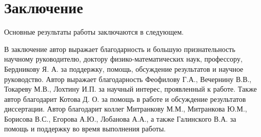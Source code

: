 \chapter*{Заключение}                       %


Основные результаты работы заключаются в следующем.



В заключение автор выражает благодарность и большую признательность научному руководителю, доктору физико-математических наук, профессору, Бердникову Я. А. за поддержку, помощь, обсуждение результатов и научное руководство. Автор выражает благодарность Феофилову Г.А., Вечернину В.В., Токареву М.В., Лохтину И.П. за научный интерес, проявленный к работе. Так­же автор благодарит Котова Д. О. за помощь в работе и обсуждение результатов диссертации. Автор благодарит коллег Митранкову М.М., Митранкова Ю.М., Борисова В.С., Егорова А.Ю., Лобанова А.А., а также Галинского В.А. за помощь и поддержку во время выполнения работы.

